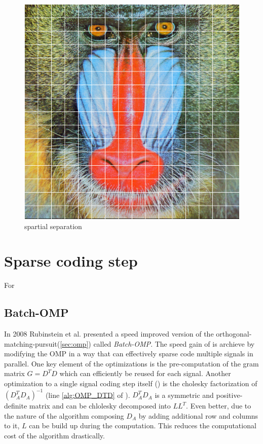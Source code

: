 \begin{figure}[h]
\centering
\includegraphics[scale = 0.25]{images/segmentation.png}
\caption{spartial separation}
\label{fig:spartial}
\end{figure}

\section{Sparse coding step}
For 

\subsection{Batch-OMP}
In 2008 Rubinstein et al.\cite{Rubinstein2008} presented a speed improved
version of the orthogonal-matching-pursuit(\ref{sec:omp}) called
\emph{Batch-OMP}. The speed gain of  is archieve
by modifying the OMP in a way that can effectively sparse code
multiple signals in parallel. One key element of the optimizations is the
pre-computation of the gram matrix $G=D^TD$ which can efficiently be reused
for each signal. Another optimization to a single signal coding step itself
() is the cholesky factorization of $\left( D_A^T D_A
\right)^{-1}$ (line \ref{alg:OMP_DTD} of ). $D_A^T
D_A$ is a symmetric and positive-definite matrix and can be chlolesky decomposed
into $LL^T$. Even better, due to the nature of the algorithm composing $D_A$
by adding additional row and columns to it, $L$ can be build up during the
computation. This reduces the computational cost of the algorithm drastically.
 
